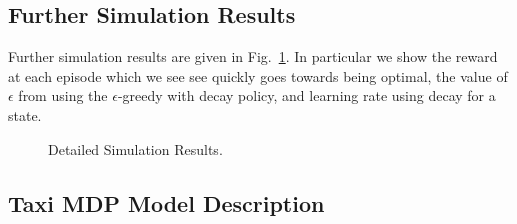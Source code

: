 \documentclass{article}
\begin{document}
\subsection{Further Simulation Results}\label{sim}
Further simulation results are given in Fig.~\ref{fig:sim_more}. In particular we show the reward at each episode which we see see quickly goes towards being optimal, the value of $\epsilon$ from using the $\epsilon$-greedy with decay policy, and learning rate using decay for a state.
\begin{figure}[H]
    \centering
    \hfill
    \caption{Detailed Simulation Results.}
    \label{fig:sim_more}
\end{figure}

\subsection{Taxi MDP Model Description}\label{mdp}
\end{document}
